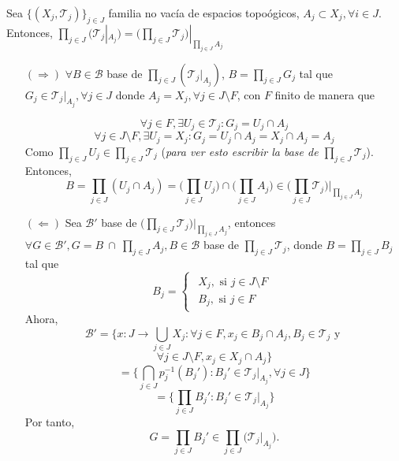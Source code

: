 \begin{ejr}[33]
  Sea $\{ ( X_{j}, \mathcal{T}_{j} ) \}_{j \in J}$ familia no vacía de espacios topoógicos, $A_{j} \subset X_{j}, \forall i \in J$. Entonces, $\prod_{j \in J} \big ( \mathcal{T}_{j}|_{A_{j}} \big ) = \big ( \prod_{j \in J} \mathcal{T}_{j} \big )|_{\prod_{j \in J} A_{j}}$
\end{ejr}

\begin{sol}
  \begin{enumerate}[label=(\roman*)]
    \item []
    \item [$(\Rightarrow)$] $\forall B \in \mathcal{B}$ base de $\prod_{j \in J} (\mathcal{T}_{j}|_{A_{j}})$, $B = \prod_{j \in J} G_{j}$ tal que $G_{j} \in \mathcal{T}_{j}|_{A_{j}}, \forall j \in J$ donde $A_{j} = X_{j}, \forall j \in J \setminus F$, con $F$ finito de manera que

      \[ 
        \forall j \in F, \exists U_{j} \in \mathcal{T}_{j} : G_{j} = U_{j} \cap A_{j}
      \] 
      \[ 
        \forall j \in J \setminus F, \exists U_{j} = X_{j} : G_{j} = U_{j} \cap A_{j} = X_{j} \cap A_{j} = A_{j}
      \] 
      Como $\prod_{j \in J} U_{j} \in \prod_{j \in J} \mathcal{T}_{j}$ (\textit{para ver esto escribir la base de $\prod_{j \in J} \mathcal{T}_{j}$}). Entonces,
      \[ 
        B = \prod_{j \in J} (U_{j} \cap A_{j}) = \Big ( \prod_{j \in J} U_{j} \Big ) \cap \Big ( \prod_{j \in J} A_{j} \Big ) \in \big ( \prod_{j \in J} \mathcal{T}_{j} \big ) |_{\prod_{j \in J} A_{j}}
      \] 

    \item [$(\Leftarrow)$] Sea $\mathcal{B'}$ base de $\big ( \prod_{j \in J} \mathcal{T}_{j} \big ) |_{\prod_{j \in J} A_{j}}$, entonces $\forall G \in \mathcal{B'}, G = B \ \cap \ \prod_{j \in J} A_{j}, B \in \mathcal{B}$ base de $\prod_{j \in J} \mathcal{T}_{j}$, donde $B = \prod_{j \in J} B_{j}$ tal que
      \[ 
        B_{j} =
        \begin{cases}
          \begin{aligned}
            X_{j}, \text{ si } j \in J \setminus F \\
            B_{j}, \text{ si } j \in F
          \end{aligned}
        \end{cases} 
      \] Ahora,
      \[
        \mathcal{B}' = \{ x : J \to \bigcup_{j \in J} X_{j}: \forall j \in F, x_{j} \in B_{j} \cap A_{j}, B_{j} \in \mathcal{T}_{j} \text{ y }
      \] 
      \[ 
        \forall j \in J \setminus F, x_{j} \in X_{j} \cap A_{j} \} 
      \] 
      \[ 
        = \{ \bigcap_{j \in J} p_{j}^{-1}(B_{j}') : B_{j}' \in \mathcal{T}_{j}|_{A_{j}}, \forall j \in J \}  
      \] 
      \[ 
        = \{ \prod_{j \in J} B_{j}': B_{j}' \in \mathcal{T}_{j}|_{A_{j}} \} 
      \] 
      Por tanto,
      \[ 
        G = \prod_{j \in J} B_{j}' \in \prod_{j \in J}\big ( \mathcal{T}_{j}|_{A_{j}} \big ).
      \] 
  \end{enumerate}
\end{sol}
